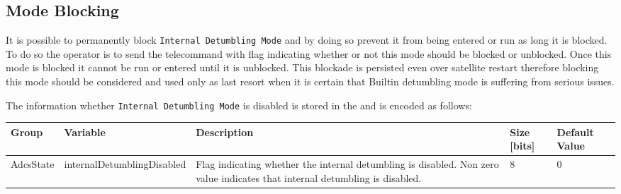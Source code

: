 \subsection{\Adcs Mode Blocking}

It is possible to permanently block \texttt{Internal Detumbling Mode} and by doing so prevent it from 
being entered or run as long it is blocked. To do so the operator is to send the  telecommand with flag indicating whether or not this mode should be blocked 
or unblocked. Once this mode is blocked it cannot be run or entered until it is unblocked. 
This blockade is persisted even over satellite restart therefore blocking this mode should be 
considered and used only as last resort when it is certain that Builtin detumbling mode
is suffering from serious issues.

The information whether \texttt{Internal Detumbling Mode} is disabled is stored in the  
and is encoded as follows:

\begin{longtable}{l|l|L{6cm}|M{1cm}|M{1.5cm}}
    \toprule
    \textbf{Group} & \textbf{Variable} & \textbf{Description} & \textbf{Size [bits]} & \textbf{Default Value} \\
    \midrule
    \endhead
    AdcsState & internalDetumblingDisabled & 
        Flag indicating whether the internal detumbling is disabled. Non zero value indicates that internal detumbling is disabled. & 8 & 0 \\
    \bottomrule
\end{longtable}

